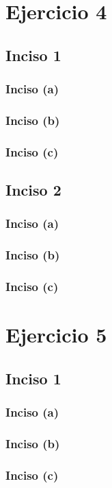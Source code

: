 \documentclass[a4paper,12pt]{article}
\begin{document}
    \section*{Ejercicio 4}
        \subsection*{Inciso 1}
            \subsubsection*{Inciso (a)}
            \subsubsection*{Inciso (b)}
            \subsubsection*{Inciso (c)}
        \subsection*{Inciso 2}
            \subsubsection*{Inciso (a)}
            \subsubsection*{Inciso (b)}
            \subsubsection*{Inciso (c)}

    \section*{Ejercicio 5}
        \subsection*{Inciso 1}
            \subsubsection*{Inciso (a)}
            \subsubsection*{Inciso (b)}
            \subsubsection*{Inciso (c)}
\end{document}
